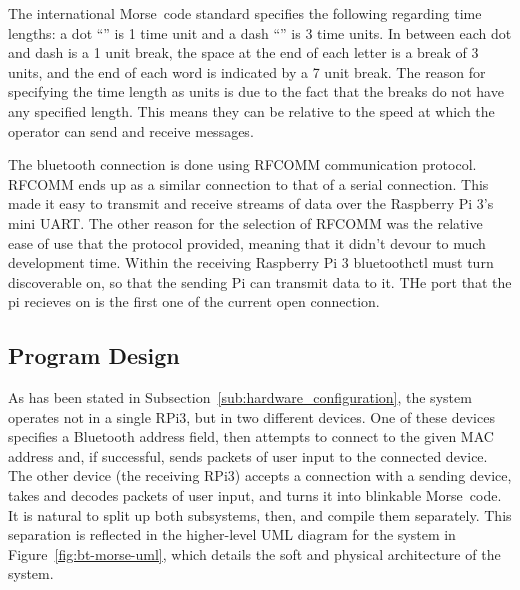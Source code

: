 \documentclass[11pt]{article}
\begin{document}
The international Morse~code standard specifies the following regarding time lengths: a dot ``\mcdot'' is 1 time unit and a dash ``\mcdash'' is 3 time units.
In between each dot and dash is a 1 unit break, the space at the end of each letter is a break of 3 units, and the end of each word is indicated by a 7 unit break.
The reason for specifying the time length as units is due to the fact that the breaks do not have any specified length.
This means they can be relative to the speed at which the operator can send and receive messages.


The bluetooth connection is done using RFCOMM communication protocol.
RFCOMM ends up as a similar connection to that of a serial connection.
This made it easy to transmit and receive streams of data over the Raspberry Pi 3's mini UART.
The other reason for the selection of RFCOMM was the relative ease of use that the protocol provided, meaning that it didn't devour to much development time.
Within the receiving Raspberry Pi 3 bluetoothctl must turn discoverable on, so that the sending Pi can transmit data to it.
THe port that the pi recieves on is the first one of the current open connection.




\subsection{Program Design}
\label{sub:program_design}






As has been stated in Subsection~\ref{sub:hardware_configuration}, the system operates not in a single RPi3, but in two different devices.
One of these devices specifies a Bluetooth address field, then attempts to connect to the given MAC address and, if successful, sends packets of user input to the connected device.
The other device (the receiving RPi3) accepts a connection with a sending device, takes and decodes packets of user input, and turns it into blinkable Morse~code.
It is natural to split up both subsystems, then, and compile them separately.
This separation is reflected in the higher-level UML diagram for the system in Figure~\ref{fig:bt-morse-uml}, which details the soft and physical architecture of the system.
\end{document}
